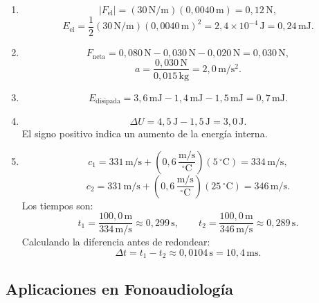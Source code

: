 \begin{enumerate}[label=\textbf{NA\arabic*.},leftmargin=*]
    \item
    \[
        \left|F_\mathrm{el}\right|
        =(30\,\text{N}/\text{m})(0{,}0040\,\text{m})
        =0{,}12\,\text{N},
    \]
    \[
        E_\mathrm{el}
        =\frac{1}{2}(30\,\text{N}/\text{m})(0{,}0040\,\text{m})^{2}
        =2{,}4\times10^{-4}\,\text{J}
        =0{,}24\,\text{mJ}.
    \]

    \item
    \[
        F_\mathrm{neta}
        =0{,}080\,\text{N}-0{,}030\,\text{N}-0{,}020\,\text{N}
        =0{,}030\,\text{N},
    \]
    \[
        a=\frac{0{,}030\,\text{N}}{0{,}015\,\text{kg}}
        =2{,}0\,\text{m}/\text{s}^{2}.
    \]

    \item
    \[
        E_\mathrm{disipada}
        =3{,}6\,\text{mJ}-1{,}4\,\text{mJ}-1{,}5\,\text{mJ}
        =0{,}7\,\text{mJ}.
    \]

    \item
    \[
        \Delta U
        =4{,}5\,\text{J}-1{,}5\,\text{J}
        =3{,}0\,\text{J}.
    \]
    El signo positivo indica un aumento de la energía interna.

    \item
    \[
        c_1
        =331\,\text{m}/\text{s}
        +\left(0{,}6\,\frac{\text{m}/\text{s}}{^{\circ}\text{C}}\right)
        (5\,^{\circ}\text{C})
        =334\,\text{m}/\text{s},
    \]
    \[
        c_2
        =331\,\text{m}/\text{s}
        +\left(0{,}6\,\frac{\text{m}/\text{s}}{^{\circ}\text{C}}\right)
        (25\,^{\circ}\text{C})
        =346\,\text{m}/\text{s}.
    \]
    Los tiempos son:
    \[
        t_1=\frac{100{,}0\,\text{m}}{334\,\text{m}/\text{s}}
        \approx0{,}299\,\text{s},
        \qquad
        t_2=\frac{100{,}0\,\text{m}}{346\,\text{m}/\text{s}}
        \approx0{,}289\,\text{s}.
    \]
    Calculando la diferencia antes de redondear:
    \[
        \Delta t=t_1-t_2\approx0{,}0104\,\text{s}=10{,}4\,\text{ms}.
    \]
\end{enumerate}

\subsection*{Aplicaciones en Fonoaudiología}


